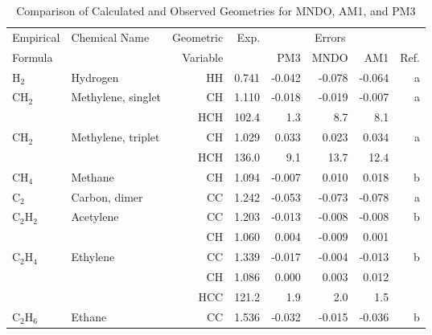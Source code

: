 \begin{table}
\caption{\label{geotab}Comparison of Calculated and Observed Geometries 
for MNDO, AM1, and PM3}
\begin{center}
\compresstable
\begin{tabular}{llrrrrrr}
 Empirical  & Chemical Name &  Geometric &  Exp. & \multicolumn{3}{c}{Errors} & \\
  Formula   &               &  Variable &        & PM3  & MNDO  &  AM1 & Ref.\\
\hline
 H$_2$          & Hydrogen                           &HH            &     0.741   &    -0.042 &    -0.078 &    -0.064 &     a \\
 CH$_2$         & Methylene, singlet                 &CH            &     1.110   &    -0.018 &    -0.019 &    -0.007 &     a \\
             &                                    &HCH         &     102.4   &       1.3 &       8.7 &       8.1   &       \\
 CH$_2$         & Methylene, triplet                 &CH            &     1.029   &     0.033 &     0.023 &     0.034 &     a \\
             &                                    &HCH         &     136.0   &       9.1 &      13.7 &      12.4   &       \\
 CH$_4$         & Methane                            &CH            &     1.094   &    -0.007 &     0.010 &     0.018 &     b \\
 C$_2$          & Carbon, dimer                      &CC            &     1.242   &    -0.053 &    -0.073 &    -0.078 &     a \\
 C$_2$H$_2$        & Acetylene                          &CC            &     1.203   &    -0.013 &    -0.008 &    -0.008 &     b \\
             &                                    &CH            &     1.060   &     0.004 &    -0.009 &     0.001 &       \\
 C$_2$H$_4$        & Ethylene                           &CC            &     1.339   &    -0.017 &    -0.004 &    -0.013 &     b \\
             &                                    &CH            &     1.086   &     0.000 &     0.003 &     0.012 &       \\
             &                                    &HCC         &     121.2   &       1.9 &       2.0 &       1.5   &       \\
 C$_2$H$_6$        & Ethane                             &CC            &     1.536   &    -0.032 &    -0.015 &    -0.036 &     b \\

\end{tabular}
\end{center}
\end{table}
